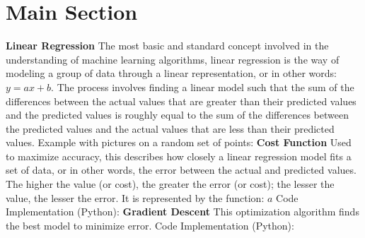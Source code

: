 \documentclass{article}
\begin{document}
\section{Main Section}
\textbf{Linear Regression}\newline
The most basic and standard concept involved in the understanding of machine learning algorithms, linear regression is the way of modeling a group of data through a linear representation, or in other words: $y=ax+b$. The process involves finding a linear model such that the sum of the differences between the actual values that are greater than their predicted values and the predicted values is roughly equal to the sum of the differences between the predicted values and the actual values that are less than their predicted values.\smallskip\newline
Example with pictures on a random set of points:\bigskip\newline
\textbf{Cost Function}\newline
Used to maximize accuracy, this describes how closely a linear regression model fits a set of data, or in other words, the error between the actual and predicted values. The higher the value (or cost), the greater the error (or cost); the lesser the value, the lesser the error. It is represented by the function: $a$\smallskip\newline
Code Implementation (Python): \bigskip\newline
\textbf{Gradient Descent}\newline
This optimization algorithm finds the best model to minimize error.\smallskip\newline
Code Implementation (Python): \newline
\end{document}
